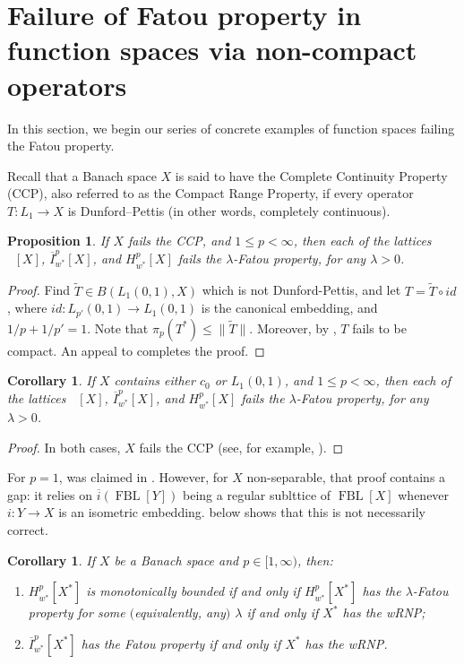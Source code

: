 \documentclass{amsart}
\theoremstyle{plain}
\newtheorem{proposition}[theorem]{Proposition}
\newtheorem{corollary}[theorem]{Corollary}
\theoremstyle{definition}
\numberwithin{equation}{section}
\DeclareMathOperator{\FBL}{FBL}
\DeclareMathOperator{\FBLp}{FBL^{\mathit{(p)}}}
\newcommand{\Hp}{H_{w^*}^{p}}
\newcommand{\Ip}{\overline{I}_{w^*}^{p}}
\begin{document}
\section{Failure of Fatou property in function spaces via non-compact operators}\label{no compactness}

In this section, we begin our series of concrete examples of function spaces failing the Fatou property.

Recall that a Banach space $X$ is said to have the Complete Continuity Property (CCP), also referred to as the Compact Range Property, if every operator $T: L_1 \to X$ is Dunford--Pettis (in other words, completely continuous).

\begin{proposition}\label{no CCP}
    If $X$ fails the CCP, and $1 \leq p < \infty$, then each of the lattices $\FBLp[X]$, $\Ip[X]$, and $\Hp[X]$ fails the $\lambda$-Fatou property, for any $\lambda > 0$.
\end{proposition}

\begin{proof}
   Find $\widetilde{T} \in B(L_1(0,1), X)$ which is not Dunford-Pettis, and let $T = \widetilde{T} \circ id$, where $id : L_{p'} (0,1) \to L_1(0,1)$ is the canonical embedding, and $1/p + 1/p' = 1$. Note that $\pi_p(T^*) \leq \| \widetilde{T}\|$. Moreover, by \cite[Proposition 1]{bourgain-DP}, $T$ fails to be compact. An appeal to  completes the proof.
\end{proof}

\begin{corollary}\label{c0 or L1}
 If $X$ contains either $c_0$ or $L_1(0,1)$, and $1 \leq p < \infty$, then each of the lattices $\FBLp[X]$, $\Ip[X]$, and $\Hp[X]$ fails the $\lambda$-Fatou property, for any $\lambda > 0$.
\end{corollary}
\begin{proof}
    In both cases, $X$ fails the CCP (see, for example, \cite[p. 76]{Talagrand}).
\end{proof}

For $p=1$,  was claimed in \cite{ABT}. However, for $X$ non-separable, that proof contains a gap: it relies on $\overline{i}(\FBL[Y])$ being a regular sublttice of $\FBL[X]$ whenever $i : Y \to X$ is an isometric embedding.  below shows that this is not necessarily correct.


\begin{corollary}\label{duals and Hp}
    If $X$ be a Banach space and $p \in [1,\infty)$, then: 
    \begin{enumerate}
        \item $\Hp[X^*]$ is monotonically bounded if and only if $\Hp[X^*]$ has the $\lambda$-Fatou property for some $($equivalently, any$)$ $\lambda$ if and only if $X^*$ has the wRNP;
        \item $\Ip[X^*]$ has the Fatou property if and only if $X^*$ has the wRNP.
    \end{enumerate}
\end{corollary}
\end{document}
